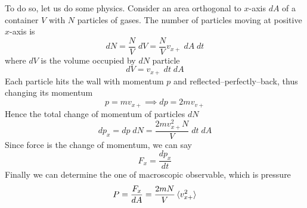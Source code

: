 \documentclass[../../../Main.tex]{subfiles}
\begin{document}
To do so, let us do some physics. Consider an area orthogonal to $x$-axis $dA$ of a container $V$ with $N$ particles of gases. The number of particles moving at positive $x$-axis is
\begin{equation*}
    dN=\frac{N}{V}\;dV=\frac{N}{V}v_{x+}\;dA\;dt
\end{equation*}
where $dV$ is the volume occupied by $dN$ particle
\begin{equation*}
    dV=v_{x+}\;dt\;dA
\end{equation*}
Each particle hits the wall with momentum $p$ and reflected--perfectly--back, thus changing its momentum 
\begin{equation*}
    p=mv_{x+}\implies dp=2mv_{v+}
\end{equation*} 
Hence the total change of momentum of particles $dN$
\begin{equation*}
    dp_{x}=dp\;dN=\frac{2mv_{x+}^2N}{V} \;dt\;dA
\end{equation*}
Since force is the change of momentum, we can say
\begin{equation*}
    F_{x}=\frac{dp_{x}}{dt}
\end{equation*}
Finally we can determine the one of macroscopic observable, which is pressure
\begin{equation*}
    P=\frac{F_x}{dA}=\frac{2mN}{V}\braket{v_{x+}^2}
\end{equation*}
\end{document}

